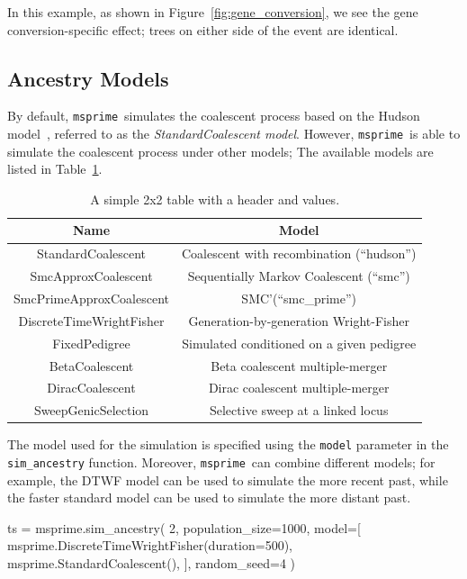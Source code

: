 \documentclass[graybox]{svmult}
\newcommand{\msprime}[0]{\texttt{msprime}}
\begin{document}
In this example, as shown in Figure~\ref{fig:gene_conversion}, we see the gene conversion-specific effect; trees on either side of the event are identical.

\subsection{Ancestry Models}\label{ancestry-models}

By default, \msprime\ simulates the coalescent process based on the Hudson model~\citep{hudson1983properties}, referred to as the
\emph{StandardCoalescent model}. However, \msprime\ is able to simulate the coalescent process under other models; The available models are listed in
Table~\ref{tab:ancestry-models}.

\begin{table}[h]
\centering
\begin{tabular}{|c|c|}
\hline
\textbf{Name} & \textbf{Model} \\
\hline
StandardCoalescent & Coalescent with recombination (“hudson”) \\
\hline
SmcApproxCoalescent & Sequentially Markov Coalescent (“smc”) \\
\hline
SmcPrimeApproxCoalescent & SMC’(“smc\_prime”) \\
\hline
DiscreteTimeWrightFisher & Generation-by-generation Wright-Fisher \\
\hline
FixedPedigree & Simulated conditioned on a given pedigree \\
\hline
BetaCoalescent & Beta coalescent multiple-merger \\
\hline
DiracCoalescent & Dirac coalescent multiple-merger \\
\hline
SweepGenicSelection & Selective sweep at a linked locus \\
\hline
\end{tabular}
\caption{A simple 2x2 table with a header and values.}
\label{tab:ancestry-models}
\end{table}

The model used for the simulation is specified using the \texttt{model} parameter
in the \texttt{sim\_ancestry} function. Moreover, \msprime\ can combine different models; for example, the DTWF model can be used to simulate the more recent
past, while the faster standard model can be used to simulate the more distant past.

\begin{pythoncode}
ts = msprime.sim_ancestry(
    2,
    population_size=1000,
    model=[
        msprime.DiscreteTimeWrightFisher(duration=500),
        msprime.StandardCoalescent(),
    ],
    random_seed=4
)

\end{pythoncode}
\end{document}
